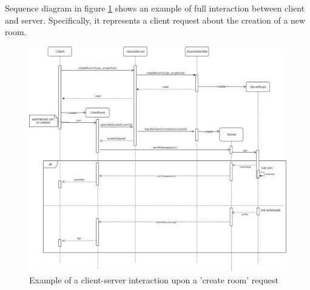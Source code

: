 \bigskip
Sequence diagram in figure \ref{fig:create_room_seq} shows an example of full interaction between client and server. Specifically, it represents a client request about the creation of a new room.

\begin{figure}
	\hspace*{-1in}
	\includegraphics[scale=0.5]{images/4-design/create_room_seq.png}
	\caption{Example of a client-server interaction upon a 'create room' request}
	\label{fig:create_room_seq}
\end{figure}